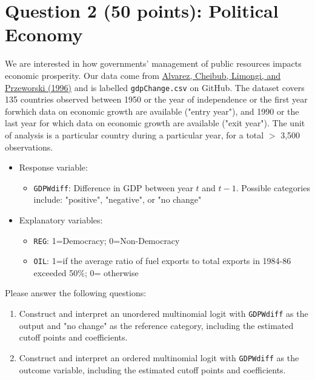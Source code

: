 \documentclass[12pt,letterpaper]{article}
\begin{document}
	
	\section*{Question 2 (50 points): Political Economy}
	\vspace{.25cm}
	\noindent We are interested in how governments' management of public resources impacts economic prosperity. Our data come from \href{https://www.researchgate.net/profile/Adam_Przeworski/publication/240357392_Classifying_Political_Regimes/links/0deec532194849aefa000000/Classifying-Political-Regimes.pdf}{Alvarez, Cheibub, Limongi, and Przeworski (1996)} and is labelled \texttt{gdpChange.csv} on GitHub. The dataset covers 135 countries observed between 1950 or the year of independence or the first year forwhich data on economic growth are available ("entry year"), and 1990 or the last year for which data on economic growth are available ("exit year"). The unit of analysis is a particular country during a particular year, for a total $>$ 3,500 observations. 
	
	\begin{itemize}
		\item
		Response variable: 
		\begin{itemize}
			\item \texttt{GDPWdiff}: Difference in GDP between year $t$ and $t-1$. Possible categories include: "positive", "negative", or "no change"
		\end{itemize}
		\item
		Explanatory variables: 
		\begin{itemize}
			\item
			\texttt{REG}: 1=Democracy; 0=Non-Democracy
			\item
			\texttt{OIL}: 1=if the average ratio of fuel exports to total exports in 1984-86 exceeded 50\%; 0= otherwise
		\end{itemize}
		
	\end{itemize}
	
	\noindent Please answer the following questions:
	
	\begin{enumerate}
		\item Construct and interpret an unordered multinomial logit with \texttt{GDPWdiff} as the output and "no change" as the reference category, including the estimated cutoff points and coefficients.
		
			
		
		\item Construct and interpret an ordered multinomial logit with \texttt{GDPWdiff} as the outcome variable, including the estimated cutoff points and coefficients.
		
			
		
	\end{enumerate}
	
	
\end{document}
